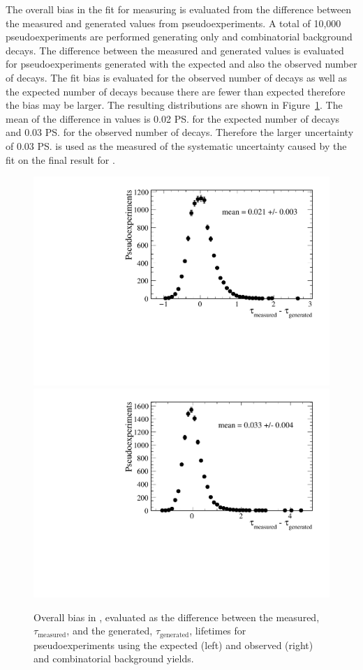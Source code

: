 The overall bias in the fit for measuring \tmumu is evaluated from the difference between the measured and generated values from pseudoexperiments. A total of 10,000 pseudoexperiments are performed generating only \bsmumu and combinatorial background decays. %
The difference between the measured and generated \tmumu values is evaluated for pseudoexperiments generated with the expected and also the observed number of \bsmumu decays. The fit bias is evaluated for the observed number of decays as well as the expected number of decays because there are fewer than expected therefore the bias may be larger. The resulting distributions are shown in Figure~\ref{fig:BsmumuYieldPulls}. The mean of the difference in \tmumu values is 0.02 \ps for the expected number of decays and 0.03 \ps for the observed number of decays. Therefore the larger uncertainty of 0.03 \ps is used as the measured of the systematic uncertainty caused by the fit on the final result for \tmumu. %

\begin{figure}[tbp]
    \centering
        \includegraphics[width=0.49 \textwidth]{./Figs/LifetimeSystematics/tau_meas-tau_gen_expected.pdf}
        \includegraphics[width=0.49 \textwidth]{./Figs/LifetimeSystematics/tau_meas_tau_gen_observed.pdf}
    \caption{Overall bias in \tmumu, evaluated as the difference between the measured, $\tau_\mathrm{{measured}}$, and the generated, $\tau_{\mathrm{generated}}$, lifetimes for pseudoexperiments using the expected (left) and observed (right) \bsmumu and combinatorial background yields.}
    \label{fig:BsmumuYieldPulls}
\end{figure}


